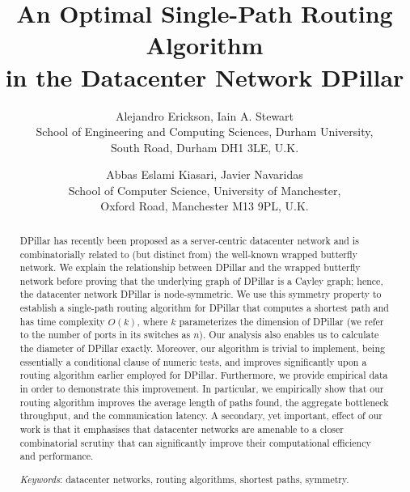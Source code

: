 \documentclass{article}
\begin{document}
\title{An Optimal Single-Path Routing Algorithm\\ in the Datacenter Network DPillar}

\author{Alejandro Erickson, Iain A. Stewart\\School of Engineering and Computing
  Sciences, Durham University,\\South Road, Durham DH1 3LE, U.K. \and Abbas Eslami Kiasari, Javier Navaridas\\School of Computer Science, University of Manchester,\\Oxford Road, Manchester M13 9PL, U.K.}

\date{}

\maketitle

\begin{abstract}
DPillar has recently been proposed as a server-centric datacenter network and is combinatorially related to (but distinct from) the well-known wrapped butterfly network. We explain the relationship between DPillar and the wrapped butterfly network before proving that the underlying graph of DPillar is a Cayley graph; hence, the datacenter network DPillar is node-symmetric. We use this symmetry property to establish a single-path routing algorithm for DPillar that computes a shortest path and has time complexity $O(k)$, where $k$ parameterizes the dimension of DPillar (we refer to the number of ports in its switches as $n$). Our analysis also enables us to calculate the diameter of DPillar exactly. Moreover, our algorithm is trivial to implement, being essentially a conditional clause of numeric tests, and improves significantly upon a routing algorithm earlier employed for DPillar. Furthermore, we provide empirical data in order to demonstrate this improvement. In particular, we empirically show that our routing algorithm improves the average length of paths found, the aggregate bottleneck throughput, and the communication latency. A secondary, yet important, effect of our work is that it emphasises that datacenter networks are amenable to a closer combinatorial scrutiny that can significantly improve their computational efficiency and performance.

\noindent\emph{Keywords\/}: datacenter networks, routing algorithms, shortest paths, symmetry.
\end{abstract}
\end{document}

